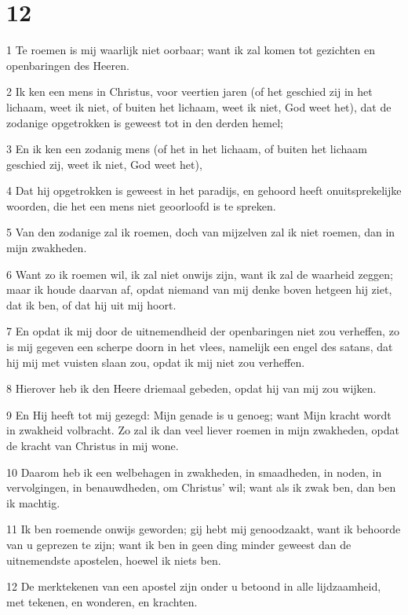 \chapter{12}

\par 1 Te roemen is mij waarlijk niet oorbaar; want ik zal komen tot gezichten en openbaringen des Heeren.
\par 2 Ik ken een mens in Christus, voor veertien jaren (of het geschied zij in het lichaam, weet ik niet, of buiten het lichaam, weet ik niet, God weet het), dat de zodanige opgetrokken is geweest tot in den derden hemel;
\par 3 En ik ken een zodanig mens (of het in het lichaam, of buiten het lichaam geschied zij, weet ik niet, God weet het),
\par 4 Dat hij opgetrokken is geweest in het paradijs, en gehoord heeft onuitsprekelijke woorden, die het een mens niet geoorloofd is te spreken.
\par 5 Van den zodanige zal ik roemen, doch van mijzelven zal ik niet roemen, dan in mijn zwakheden.
\par 6 Want zo ik roemen wil, ik zal niet onwijs zijn, want ik zal de waarheid zeggen; maar ik houde daarvan af, opdat niemand van mij denke boven hetgeen hij ziet, dat ik ben, of dat hij uit mij hoort.
\par 7 En opdat ik mij door de uitnemendheid der openbaringen niet zou verheffen, zo is mij gegeven een scherpe doorn in het vlees, namelijk een engel des satans, dat hij mij met vuisten slaan zou, opdat ik mij niet zou verheffen.
\par 8 Hierover heb ik den Heere driemaal gebeden, opdat hij van mij zou wijken.
\par 9 En Hij heeft tot mij gezegd: Mijn genade is u genoeg; want Mijn kracht wordt in zwakheid volbracht. Zo zal ik dan veel liever roemen in mijn zwakheden, opdat de kracht van Christus in mij wone.
\par 10 Daarom heb ik een welbehagen in zwakheden, in smaadheden, in noden, in vervolgingen, in benauwdheden, om Christus' wil; want als ik zwak ben, dan ben ik machtig.
\par 11 Ik ben roemende onwijs geworden; gij hebt mij genoodzaakt, want ik behoorde van u geprezen te zijn; want ik ben in geen ding minder geweest dan de uitnemendste apostelen, hoewel ik niets ben.
\par 12 De merktekenen van een apostel zijn onder u betoond in alle lijdzaamheid, met tekenen, en wonderen, en krachten.
